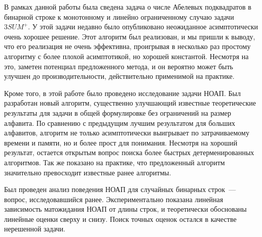 В рамках данной работы была сведена задача о числе Абелевых подквадратов в бинарной строке к монотонному и линейно ограниченному случаю задачи $3SUM^+$. У этой задачи недавно было опубликовано неожиданное асимптотически очень хорошее решение. Этот алгоритм был реализован, и мы пришли к выводу, что его реализация не очень эффективна, проигрывая в несколько раз простому алгоритму с более плохой асимптотикой, но хорошей константой. Несмотря на это, заметен потенциал предложенного метода, и он вероятно может быть улучшен до производительности, действительно применимой на практике.

Кроме того, в этой работе было проведено исследование задачи НОАП. Был разработан новый алгоритм, существенно улучшающий известные теоретические результаты для задачи в общей формулировке без ограничений на размер алфавита. По сравнению с предыдущим лучшим результатом для больших алфавитов, алгоритм не только асимптотически выигрывает по затрачиваемому времени и памяти, но и более прост для понимания. Несмотря на хороший результат, остается открытым вопрос поиска более быстрых детерменированных алгоритмов. Так же показано на практике, что предложенный алгоритм значительно превосходит известные ранее алгоритмы.

Был проведен анализ поведения НОАП для случайных бинарных строк~--- вопрос, исследовавшийся ранее. Экспериментально показана линейная зависимость матожидания НОАП от длины строк, и теоретически обоснованы линейные оценки сверху и снизу. Поиск точных оценок остался в качестве нерешенной задачи.

